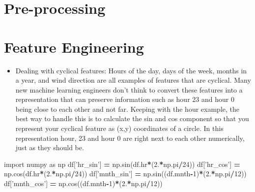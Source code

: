 \documentclass[]{book}
\newenvironment{Shaded}{\begin{snugshade}}{\end{snugshade}}
\newcommand{\DecValTok}[1]{\textcolor[rgb]{0.00,0.00,0.81}{#1}}
\newcommand{\StringTok}[1]{\textcolor[rgb]{0.31,0.60,0.02}{#1}}
\newcommand{\ImportTok}[1]{#1}
\newcommand{\OperatorTok}[1]{\textcolor[rgb]{0.81,0.36,0.00}{\textbf{#1}}}
\newcommand{\NormalTok}[1]{#1}
\providecommand{\tightlist}{%
  \setlength{\itemsep}{0pt}\setlength{\parskip}{0pt}}
\theoremstyle{definition}
\theoremstyle{definition}
\theoremstyle{definition}
\theoremstyle{remark}
\begin{document}
\section{Pre-processing}\label{pre-processing}

\section{Feature Engineering}\label{feature-engineering}

\begin{itemize}
\tightlist
\item
  Dealing with cyclical features: Hours of the day, days of the week,
  months in a year, and wind direction are all examples of features that
  are cyclical. Many new machine learning engineers don't think to
  convert these features into a representation that can preserve
  information such as hour 23 and hour 0 being close to each other and
  not far. Keeping with the hour example, the best way to handle this is
  to calculate the sin and cos component so that you represent your
  cyclical feature as (x,y) coordinates of a circle. In this
  representation hour, 23 and hour 0 are right next to each other
  numerically, just as they should be.
\end{itemize}

\begin{Shaded}
\begin{Highlighting}[]
\ImportTok{import}\NormalTok{ numpy }\ImportTok{as}\NormalTok{ np}
\NormalTok{df[}\StringTok{'hr_sin'}\NormalTok{] }\OperatorTok{=}\NormalTok{ np.sin(df.hr}\OperatorTok{*}\NormalTok{(}\DecValTok{2}\NormalTok{.}\OperatorTok{*}\NormalTok{np.pi}\OperatorTok{/}\DecValTok{24}\NormalTok{))}
\NormalTok{df[}\StringTok{'hr_cos'}\NormalTok{] }\OperatorTok{=}\NormalTok{ np.cos(df.hr}\OperatorTok{*}\NormalTok{(}\DecValTok{2}\NormalTok{.}\OperatorTok{*}\NormalTok{np.pi}\OperatorTok{/}\DecValTok{24}\NormalTok{))}
\NormalTok{df[}\StringTok{'mnth_sin'}\NormalTok{] }\OperatorTok{=}\NormalTok{ np.sin((df.mnth}\OperatorTok{-}\DecValTok{1}\NormalTok{)}\OperatorTok{*}\NormalTok{(}\DecValTok{2}\NormalTok{.}\OperatorTok{*}\NormalTok{np.pi}\OperatorTok{/}\DecValTok{12}\NormalTok{))}
\NormalTok{df[}\StringTok{'mnth_cos'}\NormalTok{] }\OperatorTok{=}\NormalTok{ np.cos((df.mnth}\OperatorTok{-}\DecValTok{1}\NormalTok{)}\OperatorTok{*}\NormalTok{(}\DecValTok{2}\NormalTok{.}\OperatorTok{*}\NormalTok{np.pi}\OperatorTok{/}\DecValTok{12}\NormalTok{))}
\end{Highlighting}
\end{Shaded}
\end{document}
